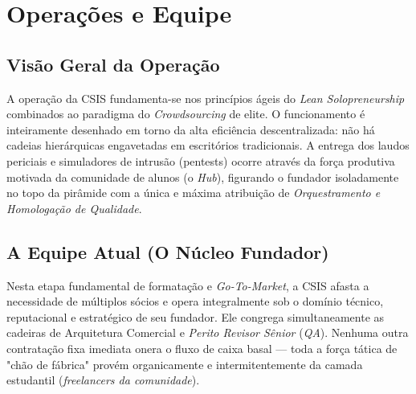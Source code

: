 \documentclass[../main.tex]{subfiles}
\begin{document}
\section{Operações e Equipe}

\subsection{Visão Geral da Operação}
A operação da CSIS fundamenta-se nos princípios ágeis do \textit{Lean Solopreneurship} combinados ao paradigma do \textit{Crowdsourcing} de elite. O funcionamento é inteiramente desenhado em torno da alta eficiência descentralizada: não há cadeias hierárquicas engavetadas em escritórios tradicionais. A entrega dos laudos periciais e simuladores de intrusão (pentests) ocorre através da força produtiva motivada da comunidade de alunos (o \textit{Hub}), figurando o fundador isoladamente no topo da pirâmide com a única e máxima atribuição de \textit{Orquestramento e Homologação de Qualidade}.

\subsection{A Equipe Atual (O Núcleo Fundador)}
Nesta etapa fundamental de formatação e \textit{Go-To-Market}, a CSIS afasta a necessidade de múltiplos sócios e opera integralmente sob o domínio técnico, reputacional e estratégico de seu fundador. Ele congrega simultaneamente as cadeiras de Arquitetura Comercial e \textit{Perito Revisor Sênior} (\textit{QA}). Nenhuma outra contratação fixa imediata onera o fluxo de caixa basal — toda a força tática de "chão de fábrica" provém organicamente e intermitentemente da camada estudantil (\textit{freelancers da comunidade}).
\end{document}
